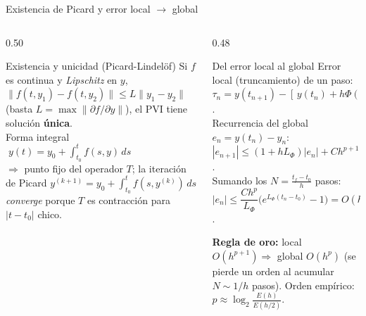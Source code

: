 \documentclass[aspectratio=169,10pt]{beamer}
\begin{document}
\begin{frame}{Existencia de Picard y error local $\to$ global}
\begin{columns}[T]
\begin{column}{0.50\textwidth}
\begin{cardidea}{Existencia y unicidad (Picard-Lindelöf)}{\faSuperscript}
{\footnotesize Si $f$ es continua y \emph{Lipschitz} en $y$,
$\|f(t,y_1)-f(t,y_2)\|\le L\|y_1-y_2\|$ (basta $L=\max\|\partial f/\partial y\|$), el PVI tiene solución \textbf{única}.\\[0.8mm]
Forma integral $\;y(t)=y_0+\displaystyle\int_{t_0}^t f(s,y)\,ds$\\[0.4mm]
$\Rightarrow$ punto fijo del operador $T$; la iteración de Picard
$y^{(k+1)}=y_0+\int_{t_0}^t f(s,y^{(k)})\,ds$ \emph{converge} porque $T$ es contracción para $|t-t_0|$ chico.}
\end{cardidea}
\end{column}
\begin{column}{0.48\textwidth}
\begin{cardgear}{Del error local al global}{\faListOl}
{\footnotesize Error local (truncamiento) de un paso:\\[0.2mm]
$\tau_n=y(t_{n+1})-[\,y(t_n)+h\Phi(t_n,y(t_n),h)\,]$.\\[0.8mm]
Recurrencia del global $e_n=y(t_n)-y_n$:\\[0.2mm]
$|e_{n+1}|\le(1+hL_\Phi)|e_n|+Ch^{p+1}$.\\[0.8mm]
Sumando los $N=\tfrac{t_f-t_0}{h}$ pasos:\\[0.2mm]
$|e_n|\le\dfrac{Ch^p}{L_\Phi}\big(e^{L_\Phi(t_n-t_0)}-1\big)=O(h^p)$.}
\end{cardgear}
\vspace{1mm}
\begin{cardnota}[\faInfoCircle]
{\footnotesize \textbf{Regla de oro:} local $O(h^{p+1})\Rightarrow$ global $O(h^p)$ (se pierde un orden al acumular $N\sim1/h$ pasos). Orden empírico: $p\approx\log_2\!\frac{E(h)}{E(h/2)}$.}
\end{cardnota}
\end{column}
\end{columns}
\end{frame}
\end{document}
